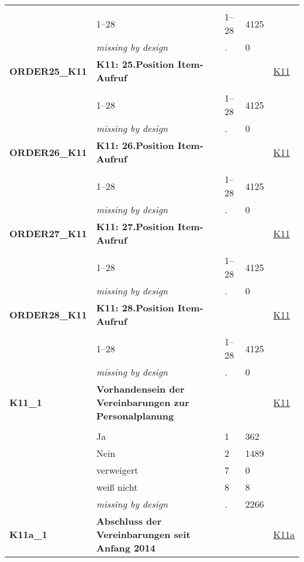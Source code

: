 \begin{longtable}{| L{2.65cm} | L{8cm} | C{1.5cm} | R{1.25cm} | C{2.25cm}  |}
   &  &  &  &  \\ 
   & 1--28 & 1--28 & 4125 &  \\ 
   & \textit{missing by design} & \textit{.} & 0 &  \\ 
   \midrule
\textbf{ORDER25\_K11}\label{var:ORDER25:K11} & \textbf{K11: 25.Position Item-Aufruf} &  &  & \hyperref[K11]{K11} \\ 
   &  &  &  &  \\ 
   & 1--28 & 1--28 & 4125 &  \\ 
   & \textit{missing by design} & \textit{.} & 0 &  \\ 
   \midrule
\textbf{ORDER26\_K11}\label{var:ORDER26:K11} & \textbf{K11: 26.Position Item-Aufruf} &  &  & \hyperref[K11]{K11} \\ 
   &  &  &  &  \\ 
   & 1--28 & 1--28 & 4125 &  \\ 
   & \textit{missing by design} & \textit{.} & 0 &  \\ 
   \midrule
\textbf{ORDER27\_K11}\label{var:ORDER27:K11} & \textbf{K11: 27.Position Item-Aufruf} &  &  & \hyperref[K11]{K11} \\ 
   &  &  &  &  \\ 
   & 1--28 & 1--28 & 4125 &  \\ 
   & \textit{missing by design} & \textit{.} & 0 &  \\ 
   \midrule
\textbf{ORDER28\_K11}\label{var:ORDER28:K11} & \textbf{K11: 28.Position Item-Aufruf} &  &  & \hyperref[K11]{K11} \\ 
   &  &  &  &  \\ 
   & 1--28 & 1--28 & 4125 &  \\ 
   & \textit{missing by design} & \textit{.} & 0 &  \\ 
   \midrule
\textbf{K11\_1}\label{var:K11:1} & \textbf{Vorhandensein der Vereinbarungen zur Personalplanung} &  &  & \hyperref[K11]{K11} \\ 
   &  &  &  &  \\ 
   & Ja & 1 & 362 &  \\ 
   & Nein & 2 & 1489 &  \\ 
   & verweigert & 7 & 0 &  \\ 
   & weiß nicht & 8 & 8 &  \\ 
   & \textit{missing by design} & \textit{.} & 2266 &  \\ 
   \midrule
\textbf{K11a\_1}\label{var:K11a:1} & \textbf{Abschluss der Vereinbarungen seit Anfang 2014} &  &  & \hyperref[K11a]{K11a} \\ 

\end{longtable}
